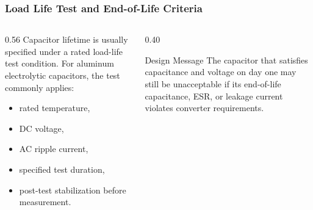 \begin{frame}
\frametitle{Load Life Test and End-of-Life Criteria}
\begin{columns}
\begin{column}{0.56\textwidth}
Capacitor lifetime is usually specified under a rated load-life test condition. For aluminum electrolytic capacitors, the test commonly applies:
\begin{itemize}
    \item rated temperature,
    \item DC voltage,
    \item AC ripple current,
    \item specified test duration,
    \item post-test stabilization before measurement.
\end{itemize}
\end{column}

\begin{column}{0.40\textwidth}
\begin{block}{Design Message}
\small
The capacitor that satisfies capacitance and voltage on day one may still be unacceptable if its end-of-life capacitance, ESR, or leakage current violates converter requirements.
\end{block}
\end{column}
\end{columns}

\end{frame}


